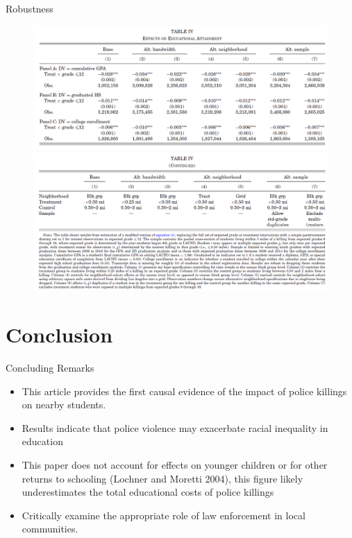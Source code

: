 \documentclass[dvipdfmx]{beamer}
\begin{document}
\begin{frame}{Robustness}
  \begin{figure}
    \centering
    \includegraphics[scale = .4]{fig_tab/os20220113/T4}
    \includegraphics[scale = .4]{fig_tab/os20220113/T4_1}
  \end{figure}
\end{frame}

\section{Conclusion}
\frame{\sectionpage}
\begin{frame}{Concluding Remarks}
  \begin{itemize}
    \item This article provides the first causal evidence of the impact of police killings on nearby students.
    \item Results indicate that police violence may
    exacerbate racial inequality in education
    \item This paper does not account for effects on younger children or for other returns to schooling (Lochner and Moretti 2004), this figure likely underestimates the total educational costs of police killings
    \item Critically examine the appropriate role of law enforcement in local
    communities.
  \end{itemize}
\end{frame}
\end{document}
